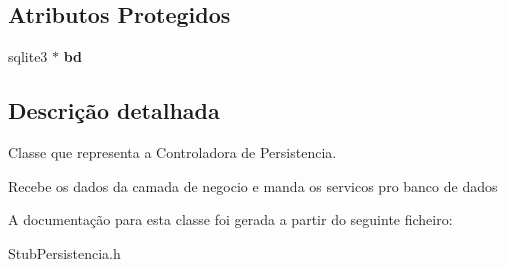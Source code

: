 \subsection*{\-Atributos \-Protegidos}
\begin{DoxyCompactItemize}
\item 
\hypertarget{class_cntr_persistencia_aaf481a438994b70ae3ec0b18e6532477}{
sqlite3 $\ast$ {\bfseries bd}}
\label{class_cntr_persistencia_aaf481a438994b70ae3ec0b18e6532477}

\end{DoxyCompactItemize}


\subsection{\-Descrição detalhada}
\-Classe que representa a \-Controladora de \-Persistencia. 

\-Recebe os dados da camada de negocio e manda os servicos pro banco de dados 

\-A documentação para esta classe foi gerada a partir do seguinte ficheiro\-:\begin{DoxyCompactItemize}
\item 
\-Stub\-Persistencia.\-h\end{DoxyCompactItemize}
